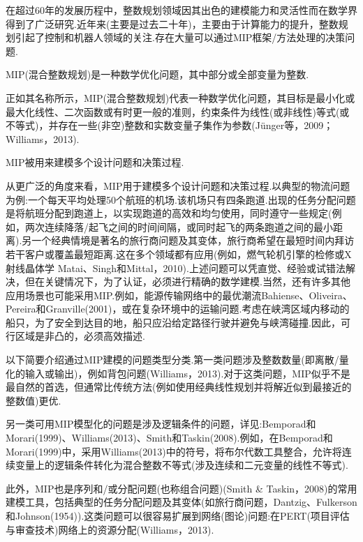 \documentclass[10pt]{article}
\begin{document}
在超过60年的发展历程中，整数规划领域因其出色的建模能力和灵活性而在数学界得到了广泛研究.近年来(主要是过去二十年)，主要由于计算能力的提升，整数规划引起了控制和机器人领域的关注.存在大量可以通过MIP框架/方法处理的决策问题.

MIP(混合整数规划)是一种数学优化问题，其中部分或全部变量为整数.

正如其名称所示，MIP(混合整数规划)代表一种数学优化问题，其目标是最小化或最大化线性、二次函数或有时更一般的准则，约束条件为线性(或非线性)等式(或不等式)，并存在一些(非空)整数和实数变量子集作为参数(Jünger等，2009；Williams，2013).

MIP被用来建模多个设计问题和决策过程.

从更广泛的角度来看，MIP用于建模多个设计问题和决策过程.以典型的物流问题为例:一个每天平均处理50个航班的机场.该机场只有四条跑道.出现的任务分配问题是将航班分配到跑道上，以实现跑道的高效和均匀使用，同时遵守一些规定(例如，两次连续降落/起飞之间的时间间隔，或同时起飞的两条跑道之间的最小距离).另一个经典情境是著名的旅行商问题及其变体，旅行商希望在最短时间内拜访若干客户或覆盖最短距离.这在多个领域都有应用(例如，燃气轮机引擎的检修或X射线晶体学 Matai、Singh和Mittal，2010).上述问题可以凭直觉、经验或试错法解决，但在关键情况下，为了认证，必须进行精确的数学建模.当然，还有许多其他应用场景也可能采用MIP.例如，能源传输网络中的最优潮流Bahiense、Oliveira、Pereira和Granville(2001)，或在复杂环境中的运输问题.考虑在峡湾区域内移动的船只，为了安全到达目的地，船只应沿给定路径行驶并避免与峡湾碰撞.因此，可行区域是非凸的，必须高效描述.



以下简要介绍通过MIP建模的问题类型分类.第一类问题涉及整数数量(即离散/量化的输入或输出)，例如背包问题(Williams，2013).对于这类问题，MIP似乎不是最自然的首选，但通常比传统方法(例如使用经典线性规划并将解近似到最接近的整数值)更优.

另一类可用MIP模型化的问题是涉及逻辑条件的问题，详见:Bemporad和Morari(1999)、Williams(2013)、Smith和Taskin(2008).例如，在Bemporad和Morari(1999)中，采用Williams(2013)中的符号，将布尔代数工具整合，允许将连续变量上的逻辑条件转化为混合整数不等式(涉及连续和二元变量的线性不等式).

此外，MIP也是序列和/或分配问题(也称组合问题)(Smith \& Taskin，2008)的常用建模工具，包括典型的任务分配问题及其变体(如旅行商问题，Dantzig、Fulkerson和Johnson(1954)).这类问题可以很容易扩展到网络(图论)问题:在PERT(项目评估与审查技术)网络上的资源分配(Williams，2013).
\end{document}
